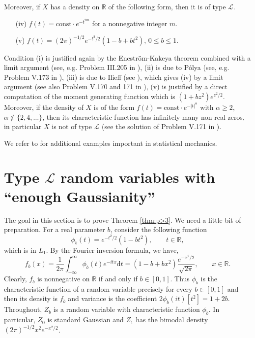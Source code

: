 \documentclass[10pt]{article}
\newcommand{\dd}{\mathrm{d}}
\newcommand{\1}{\textbf{1}}
\newcommand{\R}{\mathbb{R}}
\newcommand{\sL}{\mathscr{L}}
\theoremstyle{remark}
\theoremstyle{definition}
\begin{document}
\begin{enumerate}[(a)]
Moreover, if $X$ has a density on $\R$ of the following form, then it is of type $\sL$.

\begin{enumerate}
\item[(iv)] $f(t) = \text{const}\cdot e^{-t^{2m}}$ for a nonnegative integer $m$.  

\item[(v)] $f(t) = (2\pi)^{-1/2}e^{-t^2/2}(1-b+ bt^2)$, $0 \leq b \leq 1$.
\end{enumerate}

Condition (i) is justified again by the Enestr\"om-Kakeya theorem combined with a limit argument (see, e.g. Problem III.205 in \cite{PS1}), (ii) is due to P\'olya (see, e.g. Problem V.173 in \cite{PS}), (iii) is due to Ilieff (see \cite{Il}), which gives (iv) by a limit argument (see also Problem V.170 and 171 in \cite{PS}), (v) is justified by a direct computation of the moment generating function which is $(1+bz^2)e^{z^2/2}$. Moreover, if the density of $X$ is of the form $f(t) = \text{const}\cdot e^{-|t|^{\alpha}}$ with $\alpha \geq 2$, $\alpha \notin \{2,4,\dots\}$, then its characteristic function has infinitely many non-real zeros, in particular $X$ is not of type $\sL$ (see the solution of Problem V.171 in \cite{PS}).
\end{enumerate}

We refer to \cite{N1} for additional examples important in statistical mechanics.



\section{Type $\sL$ random variables with ``enough Gaussianity''}


The goal in this section is to prove Theorem \ref{thm:p>3}. We need a little bit of preparation. For a real parameter $b$, consider the following function
\[
\phi_b(t) = e^{-t^2/2}(1-bt^2), \qquad t \in \R,
\]
which is in $L_1$. By the Fourier inversion formula, we have,
\[
f_b(x) = \frac{1}{2\pi}\int_{-\infty}^\infty \phi_b(t)e^{-itx}\dd t = (1-b+bx^2)\frac{e^{-x^2/2}}{\sqrt{2\pi}}, \qquad x \in \R.
\]
Clearly, $f_b$ is nonnegative on $\R$ if and only if $b \in [0,1]$. Thus $\phi_b$ is the characteristic function of a random variable precisely for every $b \in [0,1]$ and then its density is $f_b$ and variance is the coefficient $2\phi_b(it)[t^2] = 1+2b$. Throughout, $Z_b$ is a random variable with characteristic function $\phi_b$. In particular, $Z_0$ is standard Gaussian and $Z_1$ has the bimodal density $(2\pi)^{-1/2}x^2e^{-x^2/2}$.
\end{document}
